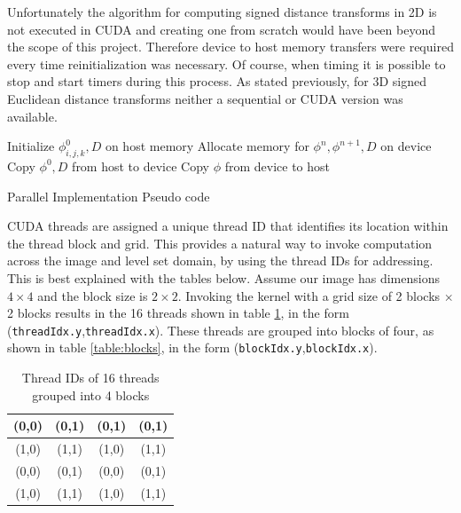 Unfortunately the algorithm for computing signed distance transforms in 2D is not executed in CUDA and creating one from scratch would have been beyond the scope of this project. Therefore device to host memory transfers were required every time reinitialization was necessary. Of course, when timing it is possible to stop and start timers during this process. As stated previously, for 3D signed Euclidean distance transforms neither a sequential or CUDA version was available.

	
\begin{algorithm}[h]
\dontprintsemicolon
\BlankLine
\SetLine
Initialize $\phi_{i,j,k}^{0} , D$ on host memory\;
Allocate memory for $\phi^n ,\phi^{n+1}, D$ on device\;
Copy $\phi^0 , D$ from host to device\;
Copy $\phi$ from device to host\;
\caption{Parallel Implementation Pseudo code}\label{alg:cuda1}
\end{algorithm}	

CUDA threads are assigned a unique thread ID that identifies its location within the thread block and grid. This provides a natural way to invoke computation across the image and level set domain, by using the thread IDs for addressing.  This is best explained with the tables below. Assume our image has dimensions $4\times 4$ and the block size is $2 \times 2$. Invoking the kernel with a grid size of 2 blocks $\times$ 2 blocks results in the 16 threads shown in table \ref{table:threads}, in the form (\texttt{threadIdx.y},\texttt{threadIdx.x}). These threads are grouped into blocks of four, as shown in table \ref{table:blocks}, in the form (\texttt{blockIdx.y},\texttt{blockIdx.x}). 

\begin{table}
\begin{center}
  \begin{tabular}{ | c | c || c | c |}
    \hline
    (0,0) & (0,1) & (0,1) & (0,1) \\ \hline
    (1,0) & (1,1) & (1,0) & (1,1) \\ \hline\hline
    (0,0) & (0,1) & (0,0) & (0,1) \\ \hline
    (1,0) & (1,1) & (1,0) & (1,1) \\
    \hline
  \end{tabular}
\end{center}
\label{table:threads}\caption{Thread IDs of 16 threads grouped into 4 blocks}
\end{table}

